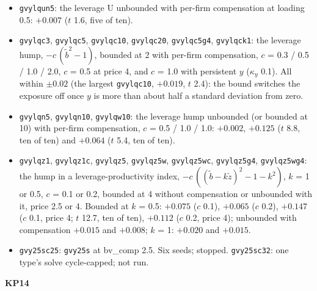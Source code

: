 \begin{itemize}
\item \texttt{gvylqun5}: the leverage U unbounded with per-firm compensation at loading 0.5: $+0.007$ ($t$ 1.6, five of ten).
\item \texttt{gvylqc3}, \texttt{gvylqc5}, \texttt{gvylqc10}, \texttt{gvylqc20}, \texttt{gvylqc5g4}, \texttt{gvylqck1}: the leverage hump, $-c\,(\tilde b^2 - 1)$, bounded at 2 with per-firm compensation, $c$ = 0.3 / 0.5 / 1.0 / 2.0, $c$ = 0.5 at price 4, and $c$ = 1.0 with persistent $y$ ($\kappa_y$ 0.1). All within $\pm0.02$ (the largest \texttt{gvylqc10}, $+0.019$, $t$ 2.4): the bound switches the exposure off once $y$ is more than about half a standard deviation from zero.
\item \texttt{gvylqn5}, \texttt{gvylqn10}, \texttt{gvylqw10}: the leverage hump unbounded (or bounded at 10) with per-firm compensation, $c$ = 0.5 / 1.0 / 1.0: $+0.002$, $+0.125$ ($t$ 8.8, ten of ten) and $+0.064$ ($t$ 5.4, ten of ten).
\item \texttt{gvylqz1}, \texttt{gvylqz1c}, \texttt{gvylqz5}, \texttt{gvylqz5w}, \texttt{gvylqz5wc}, \texttt{gvylqz5g4}, \texttt{gvylqz5wg4}: the hump in a leverage-productivity index, $-c\,((\tilde b - k\tilde z)^2 - 1 - k^2)$, $k$ = 1 or 0.5, $c$ = 0.1 or 0.2, bounded at 4 without compensation or unbounded with it, price 2.5 or 4. Bounded at $k$ = 0.5: $+0.075$ ($c$ 0.1), $+0.065$ ($c$ 0.2), $+0.147$ ($c$ 0.1, price 4; $t$ 12.7, ten of ten), $+0.112$ ($c$ 0.2, price 4); unbounded with compensation $+0.015$ and $+0.008$; $k$ = 1: $+0.020$ and $+0.015$.
\item \texttt{gvy25sc25}: \texttt{gvy25s} at bv\_comp 2.5. Six seeds; stopped. \texttt{gvy25sc32}: one type's solve cycle-capped; not run.
\end{itemize}
\noindent\textbf{KP14}

